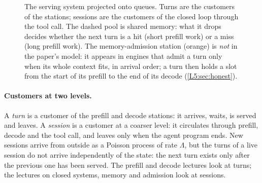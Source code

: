 \begin{figure}[t]
\caption{The serving system projected onto queues. Turns are the customers of the
stations; sessions are the customers of the closed loop through the tool call. The
dashed pool is shared memory: what it drops decides whether the next turn is a hit
(short prefill work) or a miss (long prefill work). The memory-admission station
(orange) is \emph{not} in the paper's model: it appears in engines that admit a turn
only when its whole context fits, in arrival order; a turn then holds a slot from the
start of its prefill to the end of its decode (\cref{L5:sec:honest}).}
\label{fig:projection}
\end{figure}

\paragraph{Customers at two levels.} A \emph{turn} is a customer of the prefill and
decode stations: it arrives, waits, is served and leaves. A \emph{session} is a customer
at a coarser level: it circulates through prefill, decode and the tool call, and leaves
only when the agent program ends. New sessions arrive from outside as a Poisson process
of rate $\Lambda$, but the turns of a live session do not arrive independently of the
state: the next turn exists only after the previous one has been served. The prefill and
decode lectures look at turns; the lectures on closed systems, memory and admission look
at sessions.

